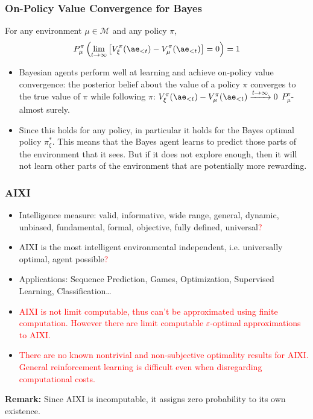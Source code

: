 \documentclass[UTF8,11pt,colorlinks,compress,openany]{beamer}%
\begin{document}
\begin{frame}\frametitle{On-Policy Value Convergence for Bayes}
\begin{theorem}
For any environment $\mu\in\mathcal{M}$ and any policy $\pi$,
\[
P_\mu^\pi\left(\lim\limits_{t\to\infty}\left[V_\xi^\pi(\ae_{<t}) - V_\mu^\pi(\ae_{<t})\right]=0\right)=1
\]
\end{theorem}
\begin{itemize}
	\item Bayesian agents perform well at learning and achieve on-policy value convergence: the posterior belief about the value of a policy $\pi$ converges to the true value of $\pi$ while following $\pi$: $V^\pi_\xi(\ae_{<t})-V^\pi_\mu(\ae_{<t})\xrightarrow{t\to\infty}0$ $P_\mu^\pi$-almost surely.
	\item Since this holds for any policy, in particular it holds for the Bayes optimal policy $\pi^*_\xi$. This means that the Bayes agent learns to predict those parts of the environment that it sees. But if it does not explore enough, then it will not learn other parts of the environment that are potentially more rewarding.
\end{itemize}
\end{frame}

\begin{frame}\frametitle{AIXI}
	\begin{itemize}
		\item Intelligence measure: valid, informative, wide range, general, dynamic, unbiased, fundamental, formal, objective, fully defined, universal\textcolor{red}{?}
		\item AIXI is the most intelligent environmental independent, i.e. universally optimal, agent possible\textcolor{red}{?}
		\item Applications: Sequence Prediction, Games, Optimization, Supervised Learning, Classification\dots
		\item \textcolor{red}{AIXI is not limit computable, thus can't be approximated using finite computation. However there are limit computable $\varepsilon$-optimal approximations to AIXI.}
		\item \textcolor{red}{There are no known nontrivial and non-subjective optimality results for AIXI. General reinforcement learning is difficult even when disregarding computational costs.}
	\end{itemize}
\textbf{Remark:} Since AIXI is incomputable, it assigns zero probability to its own existence.
\end{frame}
\end{document}
